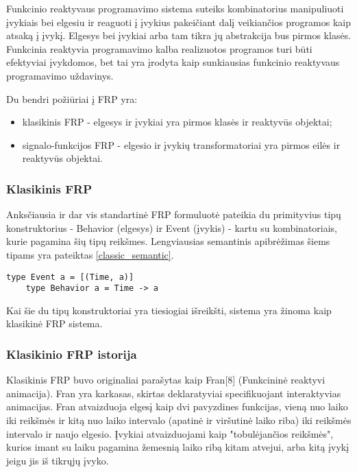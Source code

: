 Funkcinio reaktyvaus programavimo sistema suteiks kombinatorius manipuliuoti įvykiais bei elgesiu ir reaguoti į įvykius pakeičiant dalį veikiančios programos kaip atsaką į įvykį. Elgesys bei įvykiai arba tam tikra jų abstrakcija bus pirmos klasės. Funkcinia reaktyvia programavimo kalba realizuotos programos turi būti efektyviai įvykdomos, bet tai yra įrodyta kaip sunkiausias funkcinio reaktyvaus programavimo uždavinys.

Du bendri požiūriai į FRP yra:

\begin{itemize}

	\item klasikinis FRP - elgesys ir įvykiai yra pirmos klasės ir reaktyvūs objektai;

	\item signalo-funkcijos FRP - elgesio ir įvykių transformatoriai yra pirmos eilės ir reaktyvūs objektai.

\end{itemize}


\subsubsection{Klasikinis FRP}

Anksčiausia ir dar vis standartinė FRP formuluotė pateikia du primityvius tipų konstruktorius - Behavior (elgesys) ir Event (įvykis) - kartu su kombinatoriais, kurie pagamina šių tipų reikšmes. Lengviausias semantinis apibrėžimas šiems tipams yra pateiktas \ref{classic_semantic}.

\begin{lstlisting}[caption=- klasikinio FRP semantiniai tipai, label=classic_semantic]
	type Event a = [(Time, a)]
	type Behavior a = Time -> a
\end{lstlisting} 

Kai šie du tipų konstruktoriai yra tiesiogiai išreikšti, sistema yra žinoma kaip klasikinė FRP sistema.

\subsubsection{Klasikinio FRP istorija}

Klasikinis FRP buvo originaliai parašytas kaip Fran[8] (Funkcininė reaktyvi animacija). Fran yra karkasas, skirtas deklaratyviai specifikuojant interaktyvias animacijas. Fran atvaizduoja elgesį kaip dvi pavyzdines funkcijas, vieną nuo laiko iki reikšmės ir kitą nuo laiko intervalo (apatinė ir viršutinė laiko riba) iki reikšmės intervalo ir naujo elgesio. Įvykiai atvaizduojami kaip "tobulėjančios reikšmės", kurios imant su laiku pagamina žemesnią laiko ribą kitam atvejui, arba kitą įvykį jeigu jis iš tikrųjų įvyko.

